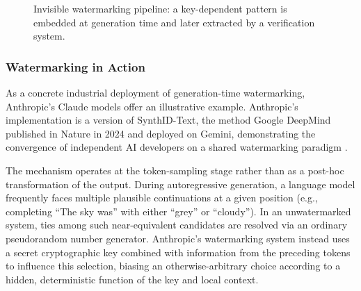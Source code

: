 \documentclass[a4paper,12pt]{article}
\begin{document}
\begin{figure}[H]
    \centering
    \caption{Invisible watermarking pipeline: a key-dependent pattern is embedded at generation time and later extracted by a verification system.}
    \label{fig:watermark}
\end{figure}

\subsubsection*{Watermarking in Action}
As a concrete industrial deployment of generation-time watermarking, Anthropic's Claude models offer an illustrative example. 
Anthropic's implementation is a version of SynthID-Text, the method Google DeepMind published in Nature in 2024 and deployed on Gemini, 
demonstrating the convergence of independent AI developers on a shared watermarking paradigm \cite{dathathri2024scalable}.

The mechanism operates at the token-sampling stage rather than as a post-hoc transformation of the output. 
During autoregressive generation, a language model frequently faces multiple plausible continuations at a given 
position (e.g., completing ``The sky was'' with either ``grey'' or ``cloudy''). In an unwatermarked system, ties among such 
near-equivalent candidates are resolved via an ordinary pseudorandom number generator. Anthropic's watermarking system 
instead uses a secret cryptographic key combined with information from the preceding tokens to influence this selection, 
biasing an otherwise-arbitrary choice according to a hidden, deterministic function of the key and local context.
\end{document}
